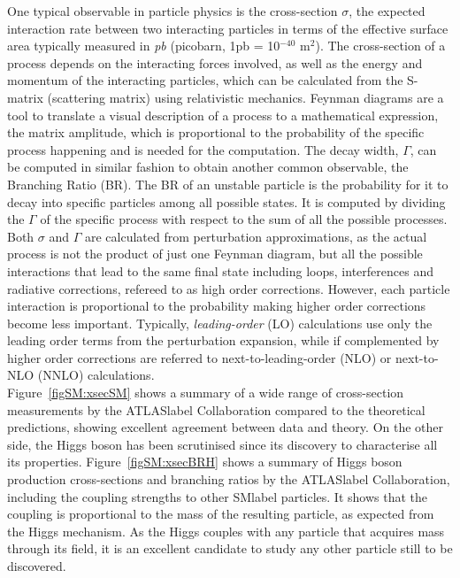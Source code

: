 One typical observable in particle physics is the cross-section $\sigma$, the expected interaction rate between two interacting particles in terms of the effective surface area typically measured in \textit{pb} (picobarn, 1pb = 10$^{-40}$ m$^2$). The cross-section of a process depends on the interacting forces involved, as well as the energy and momentum of the interacting particles, which can be calculated from the S-matrix (scattering matrix) using relativistic mechanics. Feynman diagrams are a tool to translate a visual description of a process to a mathematical expression, the matrix amplitude, which is proportional to the probability of the specific process happening and is needed for the computation. The decay width, $\Gamma$, can be computed in similar fashion to obtain another common observable, the Branching Ratio (BR). The BR of an unstable particle is the probability for it to decay into specific particles among all possible states. It is computed by dividing the $\Gamma$ of the specific process with respect to the sum of all the possible processes. Both $\sigma$ and $\Gamma$ are calculated from perturbation approximations, as the actual process is not the product of just one Feynman diagram, but all the possible interactions that lead to the same final state including loops, interferences and radiative corrections, refereed to as high order corrections. However, each particle interaction is proportional to the probability making higher order corrections become less important. Typically, \textit{leading-order} (LO) calculations use only the leading order terms from the perturbation expansion, while if complemented by higher order corrections are referred to next-to-leading-order (NLO) or next-to-NLO (NNLO) calculations.\\

Figure~\ref{figSM:xsecSM} shows a summary of a wide range of cross-section measurements by the \acrshort{ATLASlabel} Collaboration compared to the theoretical predictions, showing excellent agreement between data and theory. On the other side, the Higgs boson has been scrutinised since its discovery to characterise all its properties. Figure~\ref{figSM:xsecBRH} shows a summary of Higgs boson production cross-sections and branching ratios by the \acrshort{ATLASlabel} Collaboration, including the coupling strengths to other \acrshort{SMlabel} particles. It shows that the coupling is proportional to the mass of the resulting particle, as expected from the Higgs mechanism. As the Higgs couples with any particle that acquires mass through its field, it is an excellent candidate to study any other particle still to be discovered.\\

